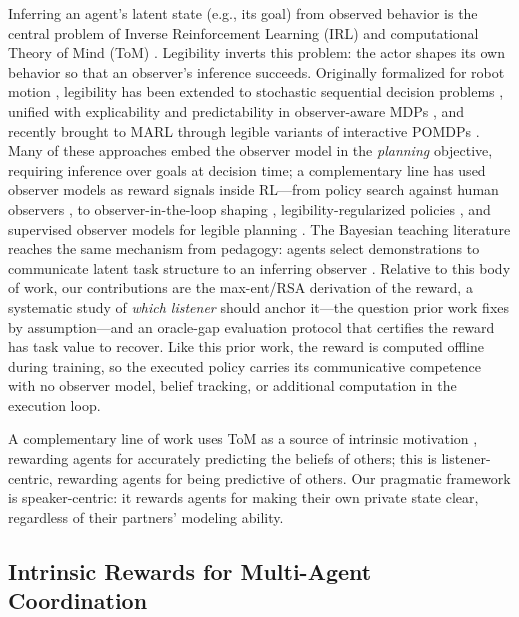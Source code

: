 \documentclass{article}
\begin{document}
Inferring an agent's latent state (e.g., its goal) from observed behavior is the central problem of Inverse Reinforcement Learning (IRL) \cite{ziebart2008maximum} and computational Theory of Mind (ToM) \cite{baker2017rational,rabinowitz2018machine}. Legibility inverts this problem: the actor shapes its own behavior so that an observer's inference succeeds. Originally formalized for robot motion \cite{dragan2013legibility}, legibility has been extended to stochastic sequential decision problems \cite{faria2024guess}, unified with explicability and predictability in observer-aware MDPs \cite{miura2021unifying,miura2024observer}, and recently brought to MARL through legible variants of interactive POMDPs \cite{liu2025active}. Many of these approaches embed the observer model in the \emph{planning} objective, requiring inference over goals at decision time; a complementary line has used observer models as reward signals inside RL---from policy search against human observers \cite{busch2017learning}, to observer-in-the-loop shaping \cite{bied2020integrating}, legibility-regularized policies \cite{persiani2022policy}, and supervised observer models for legible planning \cite{wallkotter2022slotv}. The Bayesian teaching literature reaches the same mechanism from pedagogy: agents select demonstrations to communicate latent task structure to an inferring observer \cite{ho2016showing,fisac2017pragmatic}. Relative to this body of work, our contributions are the max-ent/RSA derivation of the reward, a systematic study of \emph{which listener} should anchor it---the question prior work fixes by assumption---and an oracle-gap evaluation protocol that certifies the reward has task value to recover. Like this prior work, the reward is computed offline during training, so the executed policy carries its communicative competence with no observer model, belief tracking, or additional computation in the execution loop.

A complementary line of work uses ToM as a source of intrinsic motivation \cite{oguntola2023theory}, rewarding agents for accurately predicting the beliefs of others; this is listener-centric, rewarding agents for being predictive of others. Our pragmatic framework is speaker-centric: it rewards agents for making their own private state clear, regardless of their partners' modeling ability.

\subsection{Intrinsic Rewards for Multi-Agent Coordination}
\end{document}
